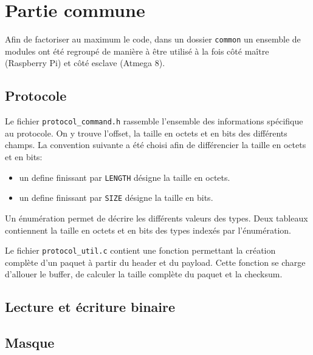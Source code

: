 \section{Partie commune}
Afin de factoriser au maximum le code, dans un dossier \texttt{common} un ensemble de modules ont été regroupé de manière à être utilisé à la fois côté maître (Raspberry Pi) et côté esclave (Atmega 8).

\subsection{Protocole}
Le fichier \texttt{protocol\_command.h} rassemble l'ensemble des informations spécifique au protocole. 
On y trouve l'offset, la taille en octets et en bits des différents champs.
La convention suivante a été choisi afin de différencier la taille en octets et en bits:
\begin{itemize}
\item un define finissant par \texttt{LENGTH} désigne la taille en octets.
\item un define finissant par \texttt{SIZE} désigne la taille en bits.
\end{itemize}

Un énumération permet de décrire les différents valeurs des types.
Deux tableaux contiennent la taille en octets et en bits des types indexés par l'énumération.


Le fichier \texttt{protocol\_util.c} contient une fonction permettant la création complète d'un paquet à partir du header et du payload.
Cette fonction se charge d'allouer le buffer, de calculer la taille complète du paquet et la checksum.

\subsection{Lecture et écriture binaire}

\subsection{Masque}
